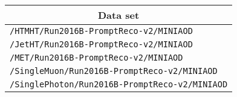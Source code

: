 \begin{center}
\begin{tabular}{l}
\hline\hline
\multicolumn{1}{c}{Data set}\tabularnewline
\hline
\verb!/HTMHT/Run2016B-PromptReco-v2/MINIAOD!\tabularnewline
\verb!/JetHT/Run2016B-PromptReco-v2/MINIAOD!\tabularnewline
\verb!/MET/Run2016B-PromptReco-v2/MINIAOD!\tabularnewline
\verb!/SingleMuon/Run2016B-PromptReco-v2/MINIAOD!\tabularnewline
\verb!/SinglePhoton/Run2016B-PromptReco-v2/MINIAOD!\tabularnewline
\hline
\end{tabular}\end{center}
